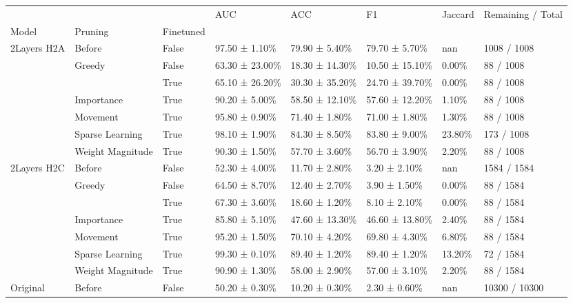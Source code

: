 \begin{tabular}{llllllll}
\toprule
 &  &  & AUC & ACC & F1 & Jaccard & Remaining / Total \\
Model & Pruning & Finetuned &  &  &  &  &  \\
\midrule
\multirow[t]{7}{*}{2Layers H2A} & Before & False & 97.50 ± 1.10\% & 79.90 ± 5.40\% & 79.70 ± 5.70\% & nan & 1008 / 1008 \\
\cline{2-8}
 & \multirow[t]{2}{*}{Greedy} & False & 63.30 ± 23.00\% & 18.30 ± 14.30\% & 10.50 ± 15.10\% & 0.00\% & 88 / 1008 \\
 &  & True & 65.10 ± 26.20\% & 30.30 ± 35.20\% & 24.70 ± 39.70\% & 0.00\% & 88 / 1008 \\
\cline{2-8}
 & Importance & True & 90.20 ± 5.00\% & 58.50 ± 12.10\% & 57.60 ± 12.20\% & 1.10\% & 88 / 1008 \\
\cline{2-8}
 & Movement & True & 95.80 ± 0.90\% & 71.40 ± 1.80\% & 71.00 ± 1.80\% & 1.30\% & 88 / 1008 \\
\cline{2-8}
 & Sparse Learning & True & 98.10 ± 1.90\% & 84.30 ± 8.50\% & 83.80 ± 9.00\% & 23.80\% & 173 / 1008 \\
\cline{2-8}
 & Weight Magnitude & True & 90.30 ± 1.50\% & 57.70 ± 3.60\% & 56.70 ± 3.90\% & 2.20\% & 88 / 1008 \\
\cline{1-8} \cline{2-8}
\multirow[t]{7}{*}{2Layers H2C} & Before & False & 52.30 ± 4.00\% & 11.70 ± 2.80\% & 3.20 ± 2.10\% & nan & 1584 / 1584 \\
\cline{2-8}
 & \multirow[t]{2}{*}{Greedy} & False & 64.50 ± 8.70\% & 12.40 ± 2.70\% & 3.90 ± 1.50\% & 0.00\% & 88 / 1584 \\
 &  & True & 67.30 ± 3.60\% & 18.60 ± 1.20\% & 8.10 ± 2.10\% & 0.00\% & 88 / 1584 \\
\cline{2-8}
 & Importance & True & 85.80 ± 5.10\% & 47.60 ± 13.30\% & 46.60 ± 13.80\% & 2.40\% & 88 / 1584 \\
\cline{2-8}
 & Movement & True & 95.20 ± 1.50\% & 70.10 ± 4.20\% & 69.80 ± 4.30\% & 6.80\% & 88 / 1584 \\
\cline{2-8}
 & Sparse Learning & True & 99.30 ± 0.10\% & 89.40 ± 1.20\% & 89.40 ± 1.20\% & 13.20\% & 72 / 1584 \\
\cline{2-8}
 & Weight Magnitude & True & 90.90 ± 1.30\% & 58.00 ± 2.90\% & 57.00 ± 3.10\% & 2.20\% & 88 / 1584 \\
\cline{1-8} \cline{2-8}
\multirow[t]{7}{*}{Original} & Before & False & 50.20 ± 0.30\% & 10.20 ± 0.30\% & 2.30 ± 0.60\% & nan & 10300 / 10300 \\
\cline{2-8}

\end{tabular}
